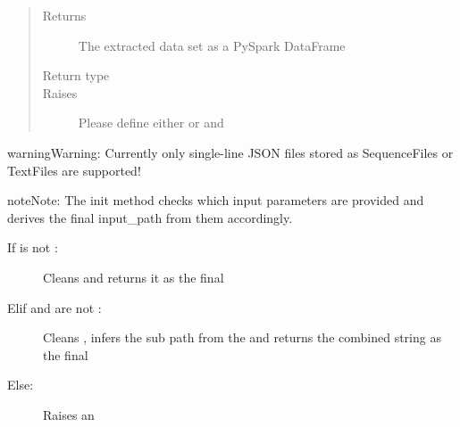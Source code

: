 \documentclass[a4paper,10pt, twoside,english]{sphinxmanual}
\begin{document}
\begin{fulllineitems}
\begin{quote}
\begin{description}
\begin{itemize}
\end{itemize}

\item[{Returns}] \leavevmode
The extracted data set as a PySpark DataFrame

\item[{Return type}] \leavevmode
{}

\item[{Raises}] \leavevmode
{} \textendash{} Please define either  or  and 

\end{description}\end{quote}

\begin{sphinxadmonition}{warning}{Warning:}
Currently only single-line JSON files stored as SequenceFiles or TextFiles are supported!
\end{sphinxadmonition}

\begin{sphinxadmonition}{note}{Note:}
The init method checks which input parameters are provided and derives the final input\_path
from them accordingly.
\begin{description}
\item[{If  is not :}] \leavevmode
Cleans  and returns it as the final 

\item[{Elif  and  are not :}] \leavevmode
Cleans , infers the sub path from the 
and returns the combined string as the final 

\item[{Else:}] \leavevmode
Raises an 


\end{description}
\end{sphinxadmonition}
\end{fulllineitems}
\end{document}
